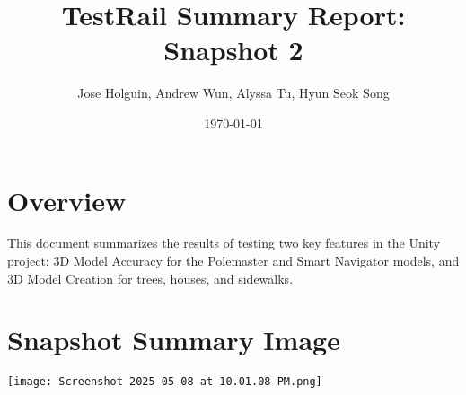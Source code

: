 \documentclass[11pt]{article}
\title{TestRail Summary Report: Snapshot 2}
\author{Jose Holguin, Andrew Wun, Alyssa Tu, Hyun Seok Song}
\date{\today}
\begin{document}
\maketitle

\section{Overview}
This document summarizes the results of testing two key features in the Unity project: 3D Model Accuracy for the Polemaster and Smart Navigator models, and 3D Model Creation for trees, houses, and sidewalks.

\section{Snapshot Summary Image}

\texttt{[image: Screenshot 2025-05-08 at 10.01.08 PM.png]}
\end{document}
